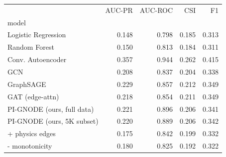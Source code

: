 \begin{tabular}{lrrrr}
\toprule
 & AUC-PR & AUC-ROC & CSI & F1 \\
model &  &  &  &  \\
\midrule
Logistic Regression & 0.148 & 0.798 & 0.185 & 0.313 \\
Random Forest & 0.150 & 0.813 & 0.184 & 0.311 \\
Conv. Autoencoder & 0.357 & 0.944 & 0.262 & 0.415 \\
GCN & 0.208 & 0.837 & 0.204 & 0.338 \\
GraphSAGE & 0.229 & 0.857 & 0.212 & 0.349 \\
GAT (edge-attn) & 0.218 & 0.854 & 0.211 & 0.349 \\
PI-GNODE (ours, full data) & 0.221 & 0.896 & 0.206 & 0.341 \\
PI-GNODE (ours, 5K subset) & 0.220 & 0.889 & 0.206 & 0.342 \\
  + physics edges & 0.175 & 0.842 & 0.199 & 0.332 \\
  - monotonicity & 0.180 & 0.825 & 0.192 & 0.322 \\
\bottomrule
\end{tabular}
